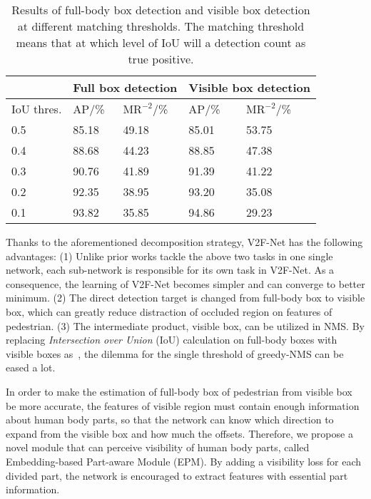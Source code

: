 \documentclass[10pt,twocolumn,letterpaper]{article}
\begin{document}
\begin{table}[ht]
	\centering
  \caption{Results of full-body box detection and visible box detection at different matching thresholds. The matching threshold means that at which level of IoU will a detection count as true positive. }
	\label{tbl:crowdhuman_iou}
	\footnotesize
	\begin{tabularx}{1.\linewidth}{X<{\centering}|X<{\centering}X<{\centering}|X<{\centering}X<{\centering}}
		\toprule
		& \multicolumn{2}{|c|}{Full box detection} & \multicolumn{2}{|c}{Visible box detection} \\
		\hline
		   IoU thres.& AP/\% & $\text{MR}^{-2}$/\%  &  AP/\% & $\text{MR}^{-2}$/\%  \\
		\hline
		0.5 & 85.18 & 49.18  &85.01 &53.75  \\
		\hline
		0.4  &88.68&44.23  &88.85&47.38\\
		\hline
		0.3  &90.76&41.89 &91.39&41.22  \\
		\hline
		0.2  &92.35&38.95  &93.20&35.08  \\
		\hline
		0.1 &93.82&35.85  &94.86&29.23  \\
		
		\bottomrule
	\end{tabularx}
\end{table}


Thanks to the aforementioned decomposition strategy, V2F-Net has the following advantages: (1) Unlike prior works tackle the above two tasks in one single network, each sub-network is responsible for its own task in V2F-Net. As a consequence, the learning of V2F-Net becomes simpler and can converge to better minimum. (2) The direct detection target is changed from full-body box to visible box, which can greatly reduce distraction of occluded region on features of pedestrian. (3) The intermediate product, visible box, can be utilized in NMS. By replacing \textit{Intersection over Union} (IoU) calculation on full-body boxes with visible boxes as~\cite{huang2020R2nms}, the dilemma for the single threshold of greedy-NMS can be eased a lot. 

In order to make the estimation of full-body box of pedestrian from visible box be more accurate, the features of visible region must contain enough information about human body parts, so that the network can know which direction to expand from the visible box and how much the offsets. Therefore, we propose a novel module that can perceive visibility of human body parts, called Embedding-based Part-aware Module (EPM). By adding a visibility loss for each divided part, the network is encouraged to extract features with essential part information. 
\end{document}
